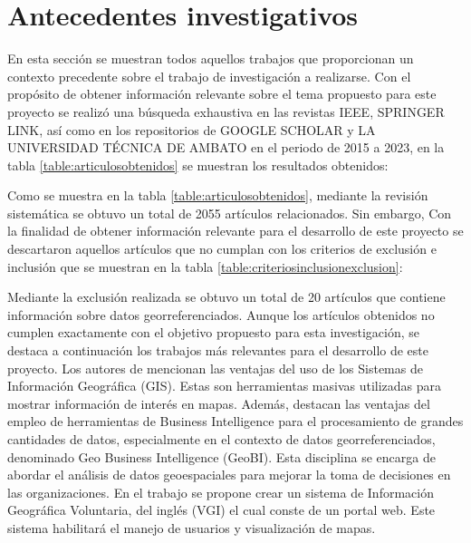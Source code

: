 \section{Antecedentes investigativos}
En esta sección se muestran todos aquellos trabajos que proporcionan un contexto
precedente sobre el trabajo de investigación a realizarse.
\bigbreak
Con el propósito de obtener información relevante sobre el tema propuesto para este proyecto se realizó una
búsqueda exhaustiva en las revistas IEEE, SPRINGER LINK, así como en los repositorios de GOOGLE SCHOLAR
y LA UNIVERSIDAD TÉCNICA DE AMBATO en el periodo de 2015 a 2023, en la tabla \ref{table:articulosobtenidos}
se muestran los resultados
obtenidos:

Como se muestra en la tabla \ref{table:articulosobtenidos}, mediante la revisión sistemática se obtuvo un total de 2055 artículos relacionados.
Sin embargo, Con la finalidad de obtener información relevante para el desarrollo de este proyecto se descartaron
aquellos artículos que no cumplan con los criterios de exclusión e inclusión que se muestran en la tabla \ref{table:criteriosinclusionexclusion}:

Mediante la exclusión realizada se obtuvo un total de 20 artículos que contiene información sobre datos georreferenciados.
Aunque los artículos obtenidos no cumplen exactamente con el objetivo propuesto para esta investigación, se destaca a continuación
los trabajos más relevantes para el desarrollo de este proyecto.
\bigbreak
Los autores de \cite{herreraGeoBIBigVGI2015} mencionan las ventajas del uso de los Sistemas de Información Geográfica (GIS).
Estas son herramientas masivas utilizadas para mostrar información de interés en mapas. Además, destacan las ventajas del empleo de
herramientas de Business Intelligence para el procesamiento de grandes cantidades de datos, especialmente en el contexto de
datos georreferenciados, denominado Geo Business Intelligence (GeoBI). Esta disciplina se encarga de abordar el análisis de datos
geoespaciales para mejorar la toma de decisiones en las organizaciones. En el trabajo se propone crear un sistema de Información
Geográfica Voluntaria, del inglés (VGI) el cual conste de un portal web. Este sistema habilitará el manejo de usuarios y visualización de mapas.
